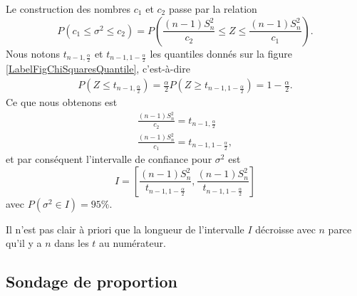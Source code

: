 \begin{example}
    Le construction des nombres \( c_1\) et \( c_2\) passe par la relation
    \begin{equation}
        P(c_1\leq \sigma^2\leq c_2)=P\left( \frac{ (n-1)S_n^2 }{ c_2 }\leq Z\leq\frac{ (n-1)S_n^2 }{ c_1 } \right).
    \end{equation}
    Nous notons \( t_{n-1,\frac{ \alpha }{2}}\) et \( t_{n-1,1-\frac{ \alpha }{2}}\) les quantiles donnés sur la figure \ref{LabelFigChiSquaresQuantile}, c'est-à-dire
    \begin{subequations}
        \begin{align}
            P(Z\leq t_{n-1,\frac{ \alpha }{2}})=\frac{ \alpha }{2}
            P(Z\geq t_{n-1,1-\frac{ \alpha }{2}})=1-\frac{ \alpha }{2}.
        \end{align}
    \end{subequations}
    Ce que nous obtenons est
    \begin{subequations}
        \begin{align}
            \frac{ (n-1)S_n^2 }{ c_2 }=t_{n-1,\frac{ \alpha }{2}}\\
            \frac{ (n-1)S_n^2 }{ c_1 }=t_{n-1,1-\frac{ \alpha }{2}},
        \end{align}
    \end{subequations}
    et par conséquent l'intervalle de confiance pour \( \sigma^2\) est
    \begin{equation}
        I=\left[ \frac{ (n-1)S_n^2 }{ t_{n-1,1-\frac{ \alpha }{2}} },\frac{ (n-1)S_n^2 }{ t_{n-1,1-\frac{ \alpha }{2}} } \right]
    \end{equation}
    avec \( P(\sigma^2\in I)=95\%\).
    
    \begin{remark}
        Il n'est pas clair à priori que la longueur de l'intervalle \( I\) décroisse avec \( n\) parce qu'il y a \( n\) dans les \( t\) au numérateur.
    \end{remark}

\end{example}

\subsection{Sondage de proportion}

